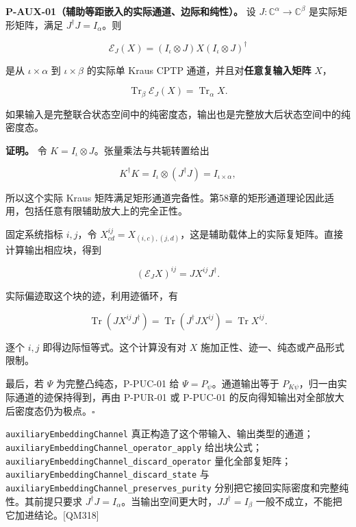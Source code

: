 \documentclass[
  11pt,
  oneside]{book}
\begin{document}
\protect\hypertarget{p-aux-01}{}{}

\textbf{P-AUX-01（辅助等距嵌入的实际通道、边际和纯性）。} 设
\(J:\mathbb C^\alpha\to\mathbb C^\beta\) 是实际矩形矩阵，满足
\(J^\dagger J=I_\alpha\)。则

\[
\mathcal E_J(X)=(I_\iota\otimes J)X(I_\iota\otimes J)^\dagger
\]

是从 \(\iota\times\alpha\) 到 \(\iota\times\beta\) 的实际单 Kraus CPTP
通道，并且对\textbf{任意复输入矩阵} \(X\)，

\[
\operatorname{Tr}_\beta\mathcal E_J(X)
=\operatorname{Tr}_\alpha X.
\]

如果输入是完整联合状态空间中的纯密度态，输出也是完整放大后状态空间中的纯密度态。

\textbf{证明。} 令 \(K=I_\iota\otimes J\)。张量乘法与共轭转置给出

\[
K^\dagger K=I_\iota\otimes(J^\dagger J)
=I_{\iota\times\alpha},
\]

所以这个实际 Kraus
矩阵满足矩形通道完备性。第58章的矩形通道理论因此适用，包括任意有限辅助放大上的完全正性。

固定系统指标 \(i,j\)，令
\(X^{ij}_{cd}=X_{(i,c),(j,d)}\)，这是辅助载体上的实际复矩阵。直接计算输出相应块，得到

\[
(\mathcal E_JX)^{ij}=JX^{ij}J^\dagger.
\]

实际偏迹取这个块的迹，利用迹循环，有

\[
\operatorname{Tr}(JX^{ij}J^\dagger)
=\operatorname{Tr}(J^\dagger JX^{ij})
=\operatorname{Tr}X^{ij}.
\]

逐个 \(i,j\) 即得边际恒等式。这个计算没有对 \(X\)
施加正性、迹一、纯态或产品形式限制。

最后，若 \(\Psi\) 为完整凸纯态，P-PUC-01 给
\(\Psi=P_\psi\)。通道输出等于
\(P_{K\psi}\)，归一由实际通道的迹保持得到，再由 P-PUR-01 或 P-PUC-01
的反向得知输出对全部放大后密度态仍为极点。\(\square\)

\texttt{auxiliary\allowbreak Embedding\allowbreak Channel}
真正构造了这个带输入、输出类型的通道；\texttt{auxiliary\allowbreak Embedding\allowbreak Channel\_\allowbreak operator\_\allowbreak apply}
给出块公式；\texttt{auxiliary\allowbreak Embedding\allowbreak Channel\_\allowbreak discard\_\allowbreak operator}
量化全部复矩阵；\texttt{auxiliary\allowbreak Embedding\allowbreak Channel\_\allowbreak discard\_\allowbreak state} 与
\texttt{auxiliary\allowbreak Embedding\allowbreak Channel\_\allowbreak preserves\_\allowbreak purity}
分别把它接回实际密度和完整纯性。其前提只要求
\(J^\dagger J=I_\alpha\)。当输出空间更大时，\(JJ^\dagger=I_\beta\)
一般不成立，不能把它加进结论。{[}QM318{]}
\end{document}

